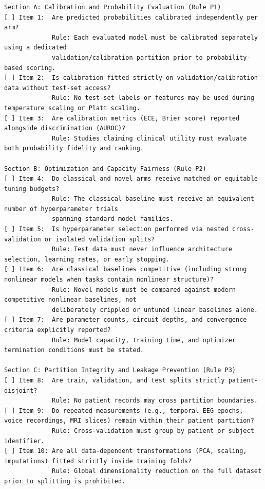 \documentclass[10pt,a4paper]{article}
\begin{document}
\begin{lstlisting}
Section A: Calibration and Probability Evaluation (Rule P1)
[ ] Item 1:  Are predicted probabilities calibrated independently per arm?
             Rule: Each evaluated model must be calibrated separately using a dedicated 
             validation/calibration partition prior to probability-based scoring.
[ ] Item 2:  Is calibration fitted strictly on validation/calibration data without test-set access?
             Rule: No test-set labels or features may be used during temperature scaling or Platt scaling.
[ ] Item 3:  Are calibration metrics (ECE, Brier score) reported alongside discrimination (AUROC)?
             Rule: Studies claiming clinical utility must evaluate both probability fidelity and ranking.

Section B: Optimization and Capacity Fairness (Rule P2)
[ ] Item 4:  Do classical and novel arms receive matched or equitable tuning budgets?
             Rule: The classical baseline must receive an equivalent number of hyperparameter trials 
             spanning standard model families.
[ ] Item 5:  Is hyperparameter selection performed via nested cross-validation or isolated validation splits?
             Rule: Test data must never influence architecture selection, learning rates, or early stopping.
[ ] Item 6:  Are classical baselines competitive (including strong nonlinear models when tasks contain nonlinear structure)?
             Rule: Novel models must be compared against modern competitive nonlinear baselines, not 
             deliberately crippled or untuned linear baselines alone.
[ ] Item 7:  Are parameter counts, circuit depths, and convergence criteria explicitly reported?
             Rule: Model capacity, training time, and optimizer termination conditions must be stated.

Section C: Partition Integrity and Leakage Prevention (Rule P3)
[ ] Item 8:  Are train, validation, and test splits strictly patient-disjoint?
             Rule: No patient records may cross partition boundaries.
[ ] Item 9:  Do repeated measurements (e.g., temporal EEG epochs, voice recordings, MRI slices) remain within their patient partition?
             Rule: Cross-validation must group by patient or subject identifier.
[ ] Item 10: Are all data-dependent transformations (PCA, scaling, imputations) fitted strictly inside training folds?
             Rule: Global dimensionality reduction on the full dataset prior to splitting is prohibited.


\end{lstlisting}
\end{document}
